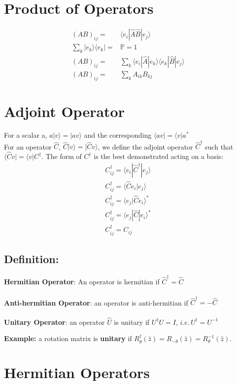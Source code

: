 \documentclass[12pt]{article}
\begin{document}
\section{Product of Operators}
\begin{align*}
(AB)_{ij} =& \langle e_i|\hat{A}\hat{B}|e_j\rangle 
\\
\sum_k |e_k\rangle \langle e_k| =& \mathbb{P} = 1 
\\
(AB)_{ij} =& \sum_k\langle e_i|\hat{A}|e_k\rangle \langle e_k|\hat{B}|e_j\rangle
\\
(AB)_{ij} =& \sum_k A_{ik}B_{kj}
\end{align*}
\section{Adjoint Operator}
For a scalar a, $a|v\rangle = |av\rangle$ and the corresponding $\langle av| = \langle v|a^*$ \\
For an operator $\hat{C}$, $\hat{C}|v\rangle = |\hat{C} v \rangle$, we define the adjoint operator $\hat{C}^\dagger$ such that $\langle \hat{C}v| = \langle v|C^{\dagger}$. The form of $C^\dagger$ is the best demonstrated acting on a basis:
\begin{align*}
C^\dagger_{ij} = \langle e_i|\hat{C}^\dagger|e_j\rangle 
\\
C^\dagger_{ij} = \langle \hat{C}e_i|e_j\rangle 
\\
C^\dagger_{ij} = \langle e_j|\hat{C}e_i\rangle ^*
\\
C^\dagger_{ij} = \langle e_j|\hat{C}|e_i\rangle ^*
\\
C^\dagger_{ij} = C_{ij}
\end{align*}
\subsection*{Definition:}
\textbf{Hermitian Operator}: An operator is hermitian if $\hat{C}^\dagger = \hat{C}$\\
\\
\textbf{Anti-hermitian Operator}: an operator is anti-hermitian if $\hat{C}^\dagger = -\hat{C}$\\
\\	
\textbf{Unitary Operator}: an operator $\hat{U}$ is unitary if $U^\dagger U = I, \, i.e. \, U^\dagger = U^{-1}$

\textbf{Example:} a rotation matrix is \textbf{unitary} if $R_\theta^\dagger(\hat{z}) = R_{-\theta}(\hat{z}) = R_\theta^{-1}(\hat{z})$.

\section{Hermitian Operators}
\end{document}
